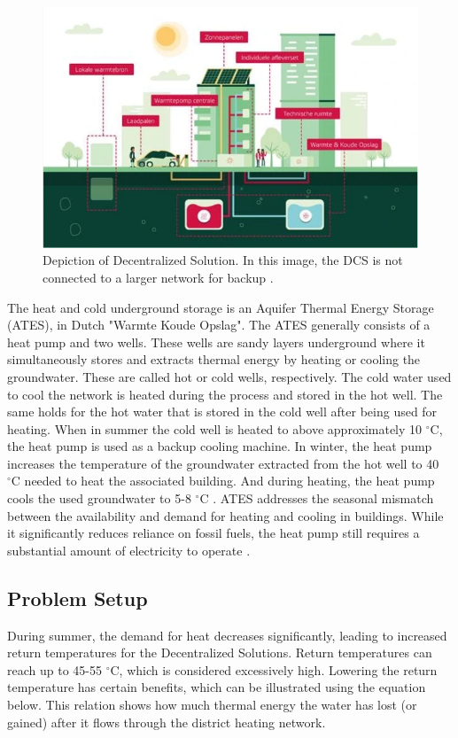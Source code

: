 \begin{figure}[h]
    \centering
    \includegraphics[width=0.5\linewidth]{figuresLIT/DCS.png}
    \caption{Depiction of Decentralized Solution. In this image, the DCS is not connected to a larger network for backup \cite{DCSeneco}.}
    \label{fig:DCS}
\end{figure}
The heat and cold underground storage is an Aquifer Thermal Energy Storage (ATES), in Dutch "Warmte Koude Opslag". The ATES generally consists of a heat pump and two wells. These wells are sandy layers underground where it simultaneously stores and extracts thermal energy by heating or cooling the groundwater. These are called hot or cold wells, respectively. The cold water used to cool the network is heated during the process and stored in the hot well. The same holds for the hot water that is stored in the cold well after being used for heating. When in summer the cold well is heated to above approximately 10 $^{\circ}\text{C}$, the heat pump is used as a backup cooling machine. In winter, the heat pump increases the temperature of the groundwater extracted from the hot well to 40 $^{\circ}\text{C}$ needed to heat the associated building. And during heating, the heat pump cools the used groundwater to 5-8 $^{\circ}\text{C}$ \cite{bloemendal2018hidden}. ATES addresses the seasonal mismatch between the availability and demand for heating and cooling in buildings. While it significantly reduces reliance on fossil fuels, the heat pump still requires a substantial amount of electricity to operate \cite{tudelft_ates_triplet}.

\subsection{Problem Setup}
During summer, the demand for heat decreases significantly, leading to increased return temperatures for the Decentralized Solutions. Return temperatures can reach up to 45-55 $^{\circ}\text{C}$, which is considered excessively high. Lowering the return temperature has certain benefits, which can be illustrated using the equation below. This relation shows how much thermal energy the water has lost (or gained) after it flows through the district heating network. 

